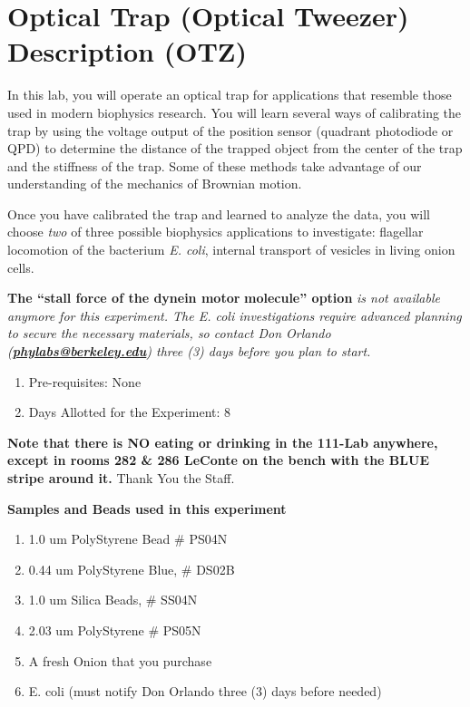 \documentclass{../lab}
\begin{document}
\maketitle

\tableofcontents

\section{Optical Trap (Optical Tweezer) Description (OTZ)}

In this lab, you will operate an optical trap for applications that resemble those used in modern biophysics research. You will learn several ways of calibrating the trap by using the voltage output of the position sensor (quadrant photodiode or QPD) to determine the distance of the trapped object from the center of the trap and the stiffness of the trap. Some of these methods take advantage of our understanding of the mechanics of Brownian motion.

Once you have calibrated the trap and learned to analyze the data, you will choose \emph{two} of three possible biophysics applications to investigate: flagellar locomotion of the bacterium \emph{E. coli}, internal transport of vesicles in living onion cells.

\textbf{The ``}\textbf{stall force of the dynein motor }\textbf{molecule'' option}\emph{ is not available anymore for this experiment. The E. coli  investigations require advanced planning to secure the necessary materials, so contact Don Orlando (\href{\MailDonOrlando}{\textbf{phylabs@berkeley.edu}}) three (3) days before you plan to start.}

\begin{enumerate}
    \item Pre-requisites: None

    \item Days Allotted for the Experiment: 8

\end{enumerate}

\textbf{Note that there is NO eating or drinking in the 111-Lab anywhere, except in rooms 282 \& 286 LeConte on the bench with the BLUE stripe around it.} Thank You the Staff.

\textbf{Samples and Beads used in this experiment}

\begin{enumerate}
    \item 1.0 um PolyStyrene Bead \# PS04N

    \item 0.44 um PolyStyrene Blue, \# DS02B

    \item 1.0 um Silica Beads, \# SS04N

    \item 2.03 um PolyStyrene \# PS05N

    \item A fresh Onion that you purchase

    \item E. coli (must notify Don Orlando three (3) days before needed)

\end{enumerate}
\end{document}
